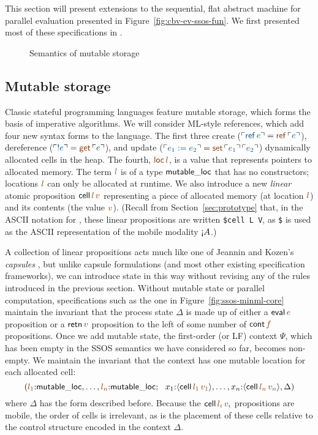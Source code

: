 This section will present extensions to the sequential, flat
abstract machine for parallel evaluation presented in
Figure~\ref{fig:cbv-ev-ssos-fun}. We first presented 
most of these specifications in
\cite{pfenning09substructural}.

\begin{figure}[t]
\caption{Semantics of mutable storage}
\label{fig:ssos-mutable}
\end{figure}

\subsection{Mutable storage}
\label{sec:mutable-storage}

Classic stateful programming languages feature mutable storage, which
forms the basis of imperative algorithms. We will consider ML-style
references, which add four new syntax forms to the language.  The
first three create ($\interp{{\sf ref}\,e} = \lf{{\sf
    ref}\,\interp{e}}$), dereference ($\interp{{!}e} = \lf{{\sf
    get}\,\interp{e}}$), and update ($\interp{e_1 := e_2} = \lf{{\sf
    set}\,\interp{e_1}\,\interp{e_2}}$) dynamically allocated cells in
the heap.  The fourth, $\lf{{\sf loc}\,l}$, is a value that represents
pointers to allocated memory. The term $\lf{l}$ is of a type ${\sf
  mutable\_loc}$ that has no constructors; locations $\lf{l}$ can only
be allocated at runtime. We also introduce a new {\it linear} atomic
proposition ${\sf cell}\,\lf{l}\,\lf{v}$ representing a piece of
allocated memory (at location $\lf{l}$) and its contents (the value
$\lf{v}$). (Recall from Section~\ref{sec:prototype} that, in the ASCII
notation for \sls, these linear propositions are written
\verb'$cell L V', as \verb'$' is used as the ASCII representation of
the mobile modality ${\gnab}A$.)

A collection of linear propositions acts much like one of Jeannin and
Kozen's {\it capsules} \cite{jeannin12computing}, but unlike capsule
formulations (and most other existing specification frameworks), we
can introduce state in this way without revising any of the rules
introduced in the previous section. Without mutable state or parallel
computation, specifications such as the one in
Figure~\ref{fig:ssos-minml-core} maintain the invariant that the
process state $\Delta$ is made up of either a ${\sf eval}\,\lf{e}$
proposition or a ${\sf retn}\,\lf{v}$ proposition to the left of some
number of ${\sf cont}\,\lf{f}$ propositions. Once we add mutable
state, the first-order (or LF) context $\Psi$, which has been empty in
the SSOS semantics we have considered so far, becomes non-empty. We
maintain the invariant that the context has one mutable location for
each allocated cell:
\[
(\lf{l_1}{:}{\sf mutable\_loc}, \ldots, \lf{l_n}{:}{\sf mutable\_loc}; ~~
 x_1{:}\susp{{\sf cell}\,\lf{l_1}\,\lf{v_1}}, \ldots, 
 x_n{:}\susp{{\sf cell}\,\lf{l_n}\,\lf{v_n}}, 
 \Delta)
\]
where $\Delta$ has the form described before. Because the ${\sf
  cell}\,\lf{l_i}\,\lf{v_i}$ propositions are mobile, the order
of cells is irrelevant, as is the placement of these cells relative
to the control structure encoded in the context $\Delta$.

